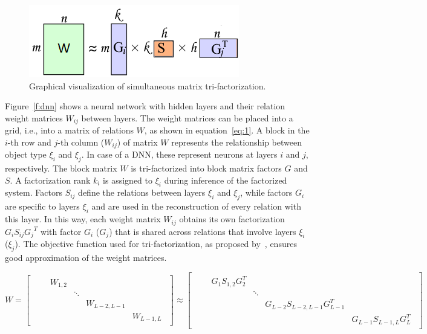 \documentclass{article} %
\begin{document}
\begin{figure}[!ht]
\centering 
\includegraphics[width=.5\textwidth]{mf2.png}
\caption{Graphical visualization of simultaneous matrix tri-factorization.}
\label{f:mf2}
\end{figure}

Figure~\ref{f:dnn} shows a neural network with hidden layers and their relation weight 
matrices $W_{ij}$ between layers. The weight matrices can be placed into a grid, i.e., 
into a matrix of relations $W$, as shown in equation~\ref{eq:1}. A block in the $i$-th row
and $j$-th  column ($W_{ij}$) of matrix $W$ represents the relationship between object 
type $\xi_i$  and $\xi_j$. In case of a DNN, these represent neurons at layers $i$ and 
$j$, respectively. The block matrix $W$ is tri-factorized into block matrix factors $G$ 
and $S$. A factorization rank $k_i$ is assigned to $\xi_i$ during inference of the 
factorized system. Factors $S_{ij}$ define the relations between layers $\xi_i$ and 
$\xi_j$, while factors $G_i$ are specific to layers $\xi_i$ and are used in the 
reconstruction of every relation with this layer. In this way, each weight matrix $W_{ij}$
obtains its own factorization $G_i S_{ij} {G_j}^T$ with factor $G_i$ ($G_j$) that is 
shared across relations that involve layers $\xi_i$ ($\xi_j$). The objective function 
used for tri-factorization, as proposed by~\cite{zitnik2015data}, ensures good 
approximation of the weight matrices.

\begin{equation} \label{eq:1}
W = 
\begin{bmatrix} 
\begin{smallmatrix}
& &W_{1,2} & & & \\
& & &\ddots & & \\ 
& & & &W_{L-2,L-1} & \\ 
& & & & &W_{L-1,L} 
\end{smallmatrix}
\end{bmatrix} 
\approx 
\begin{bmatrix} 
\begin{smallmatrix}
& &G_1S_{1,2}G_2^T & & & \\ 
& & &\ddots & & \\ 
& & & &G_{L-2}S_{L-2,L-1}G_{L-1}^T & \\ 
& & & & &G_{L-1}S_{L-1,L}G_L^T 
\end{smallmatrix}
\end{bmatrix}
\end{equation}
\end{document}

